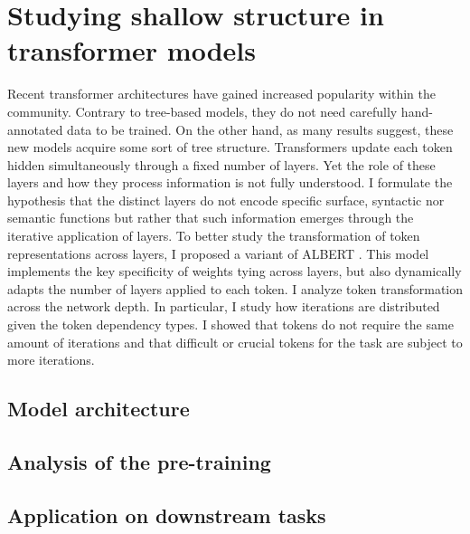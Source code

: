 \setchapterpreamble[u]{\margintoc}
\chapter{Studying shallow structure in transformer models}

Recent transformer architectures have gained increased popularity within the community. Contrary to tree-based models, they do not need carefully hand-annotated data to be trained. On the other hand, as many results suggest, these new models acquire some sort of tree structure. Transformers update each token hidden simultaneously through a fixed number of layers. Yet the role of these layers and how they process information is not fully understood. I formulate the hypothesis that the distinct layers do not encode specific surface, syntactic nor semantic functions but rather that such information emerges through the iterative application of layers. To better study the transformation of token representations across layers, I proposed a variant of ALBERT \parencite{simoulin_2021b}. This model implements the key specificity of weights tying across layers, but also dynamically adapts the number of layers applied to each token. I analyze token transformation across the network depth. In particular, I study how iterations are distributed given the token dependency types. I showed that tokens do not require the same amount of iterations and that difficult or crucial tokens for the task are subject to more iterations.

\section{Model architecture}

\section{Analysis of the pre-training}

\section{Application on downstream tasks}
